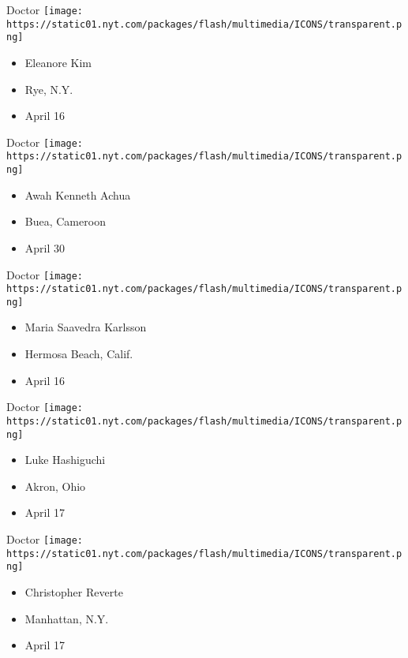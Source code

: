 \protect\hyperlink{item-eleanore-kim}{}

Doctor
\texttt{[image: https://static01.nyt.com/packages/flash/multimedia/ICONS/transparent.png]}

\begin{itemize}
\tightlist
\item
  Eleanore Kim
\item
  Rye, N.Y.
\item
  April 16
\end{itemize}

\protect\hyperlink{item-awah-kenneth-achua}{}

Doctor
\texttt{[image: https://static01.nyt.com/packages/flash/multimedia/ICONS/transparent.png]}

\begin{itemize}
\tightlist
\item
  Awah Kenneth Achua
\item
  Buea, Cameroon
\item
  April 30
\end{itemize}

\protect\hyperlink{item-maria-saavedra-karlsson}{}

Doctor
\texttt{[image: https://static01.nyt.com/packages/flash/multimedia/ICONS/transparent.png]}

\begin{itemize}
\tightlist
\item
  Maria Saavedra Karlsson
\item
  Hermosa Beach, Calif.
\item
  April 16
\end{itemize}

\protect\hyperlink{item-luke-hashiguchi}{}

Doctor
\texttt{[image: https://static01.nyt.com/packages/flash/multimedia/ICONS/transparent.png]}

\begin{itemize}
\tightlist
\item
  Luke Hashiguchi
\item
  Akron, Ohio
\item
  April 17
\end{itemize}

\protect\hyperlink{item-christopher-reverte}{}

Doctor
\texttt{[image: https://static01.nyt.com/packages/flash/multimedia/ICONS/transparent.png]}

\begin{itemize}
\tightlist
\item
  Christopher Reverte
\item
  Manhattan, N.Y.
\item
  April 17
\end{itemize}

